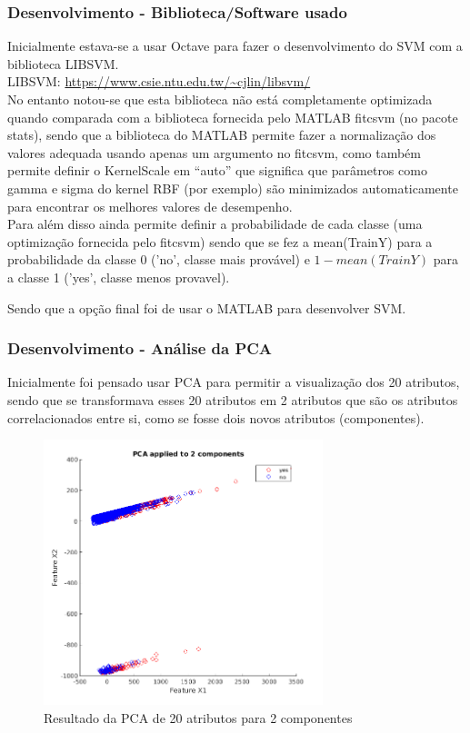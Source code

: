 \documentclass[portugues,final]{revdetua}
\begin{document}
\subsubsection{Desenvolvimento - Biblioteca/Software usado}
Inicialmente estava-se a usar Octave para fazer o desenvolvimento do SVM com a biblioteca LIBSVM.\\
LIBSVM: \url{https://www.csie.ntu.edu.tw/~cjlin/libsvm/}\\
No entanto notou-se que esta biblioteca não está completamente optimizada quando comparada com a biblioteca fornecida pelo MATLAB fitcsvm (no pacote stats), sendo que a biblioteca do MATLAB permite fazer a normalização dos valores adequada usando apenas um argumento no fitcsvm, como também permite definir o KernelScale em “auto” que significa que parâmetros como gamma e sigma do kernel RBF (por exemplo) são minimizados automaticamente para encontrar os melhores valores de desempenho.\\
Para além disso ainda permite definir a probabilidade de cada classe (uma optimização fornecida pelo fitcsvm) sendo que se fez a mean(TrainY) para a probabilidade da classe 0 ('no', classe mais provável) e $1 - mean(TrainY)$ para a classe 1 ('yes', classe menos provavel).

Sendo que a opção final foi de usar o MATLAB para desenvolver SVM. 

\subsubsection{Desenvolvimento - Análise da PCA}

Inicialmente foi pensado usar PCA para permitir a visualização dos 20 atributos, sendo que se transformava esses 20 atributos em 2 atributos que são os atributos correlacionados entre si, como se fosse dois novos atributos (componentes).

\begin{figure}[H]
\centerline{\includegraphics[width=230pt]{images/svm_pca.png}}
\caption{Resultado da PCA de 20 atributos para 2 componentes}
\label{img:complete}
\end{figure}
\end{document}
